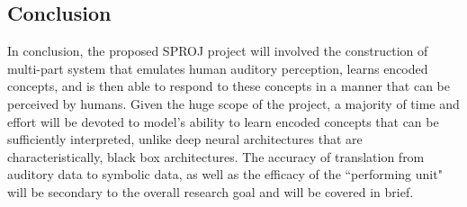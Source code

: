 \documentclass[../main.tex]{subfiles}
\begin{document}
\subsection {Conclusion}
In conclusion, the proposed SPROJ project will involved the construction of multi-part system that emulates human auditory perception, learns encoded concepts, and is then able to respond to these concepts in a manner that can be perceived by humans. Given the huge scope of the project, a majority of time and effort will be devoted to model's ability to learn encoded concepts that can be sufficiently interpreted, unlike deep neural architectures that are characteristically, black box architectures. The accuracy of translation from auditory data to symbolic data, as well as the efficacy of the ``performing unit" will be secondary to the overall research goal and will be covered in brief.
\end{document}
